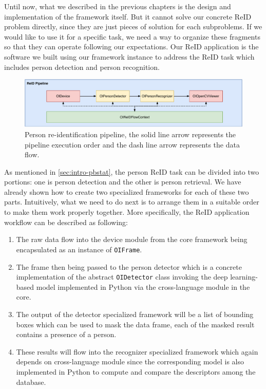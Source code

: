 Until now, what we described in the previous chapters is the design and 
implementation of the framework itself. But it cannot solve our
concrete ReID problem directly, since they are just pieces of solution for each 
subproblems. If we would like to use it for a specific task, we need a way to 
organize these fragments so that they can operate following our expectations.
Our ReID application is the software we built using our framework instance to 
address the ReID task which includes person detection and person recognition.

\begin{figure}
    \centering
    \includegraphics[width=\linewidth]{figures/framework_app_reid_pipeline.pdf}
    \caption[Person re-identification pipeline]
    {Person re-identification pipeline,  the solid line arrow represents
    the pipeline execution order and the dash line arrow represents the
    data flow.}
    \label{fig:fw-app-reid-pipeline}
\end{figure}

As mentioned in \autoref{sec:intro-pbstat}, the person ReID task can be divided
into two portions: one is person detection and the other is person retrieval. 
We have already shown how to create two specialized frameworks for each of these 
two parts. Intuitively, what we
need to do next is to arrange them in a suitable order to make them work 
properly together. More specifically, the ReID application workflow can be described as
following:

\begin{enumerate}
    \item The raw data flow into the device module from the core framework being encapsulated as an instance of \texttt{OIFrame}.
    \item The frame then being passed to the person detector which is a
    concrete implementation of the abstract \texttt{OIDetector} class invoking
    the deep learning-based model implemented in Python via the cross-language
    module in the core.
    \item The output of the detector specialized framework will be a list of
    bounding boxes which can be used to mask the data frame, each of the masked
    result contains a presence of a person.
    \item These results will flow into the recognizer specialized framework
    which again depends on cross-language module since the corresponding
    model is also implemented in Python to compute and compare the descriptors 
    among the database.
\end{enumerate}


